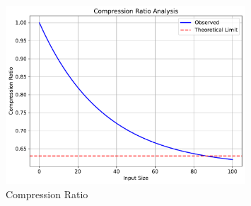 \begin{figure}[h]
\centering
\includegraphics[width=0.8\textwidth]{py_visuals/figures/compression_ratio.pdf}
\caption{Compression Ratio}
\label{fig:compression_ratio_intro}
\end{figure} 